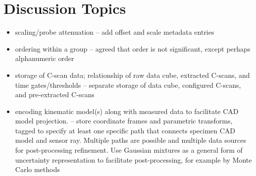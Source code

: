 \documentclass{article}
\begin{document}
\section{Discussion Topics}
\begin{itemize}
\item scaling/probe attenuation -- add offset and scale metadata entries
\item ordering within a group -- agreed that order is not significant, except perhaps alphanumeric order
\item storage of C-scan data; relationship of raw data cube, extracted C-scans, and time gates/thresholds -- separate storage of data cube, configured C-scans, and pre-extracted C-scans
\item encoding kinematic model(s) along with measured data to facilitate CAD model projection. -- store coordinate frames and parametric transforms, tagged to specify at least one specific path that connects specimen CAD model and sensor ray. Multiple paths are possible and multiple data sources for post-processing refinement. Use Gaussian mixtures as a general form of uncertainty representation to facilitate post-processing, for example by Monte Carlo methods
\end{itemize}
\end{document}
